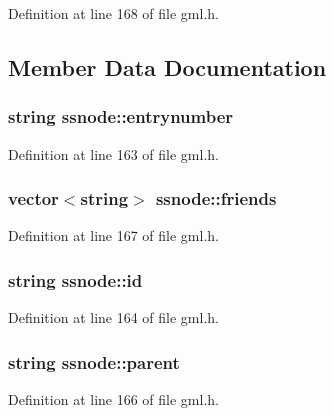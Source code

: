 \-Definition at line 168 of file gml.\-h.



\subsection{\-Member \-Data \-Documentation}
\hypertarget{structssnode_aa407afb76f9b31ceff8fefb114469428}{
\subsubsection[{entrynumber}]{\setlength{\rightskip}{0pt plus 5cm}string {\bf ssnode\-::entrynumber}}}\label{structssnode_aa407afb76f9b31ceff8fefb114469428}


\-Definition at line 163 of file gml.\-h.

\hypertarget{structssnode_aecc6dcbc2d5b662c709f3ee02ace7889}{
\subsubsection[{friends}]{\setlength{\rightskip}{0pt plus 5cm}vector$<$string$>$ {\bf ssnode\-::friends}}}\label{structssnode_aecc6dcbc2d5b662c709f3ee02ace7889}


\-Definition at line 167 of file gml.\-h.

\hypertarget{structssnode_a8c1828f00290ce66cc8c5e72f58e90a1}{
\subsubsection[{id}]{\setlength{\rightskip}{0pt plus 5cm}string {\bf ssnode\-::id}}}\label{structssnode_a8c1828f00290ce66cc8c5e72f58e90a1}


\-Definition at line 164 of file gml.\-h.

\hypertarget{structssnode_ac642b12bf88fdda59dcb44ea80f7d65c}{
\subsubsection[{parent}]{\setlength{\rightskip}{0pt plus 5cm}string {\bf ssnode\-::parent}}}\label{structssnode_ac642b12bf88fdda59dcb44ea80f7d65c}


\-Definition at line 166 of file gml.\-h.

